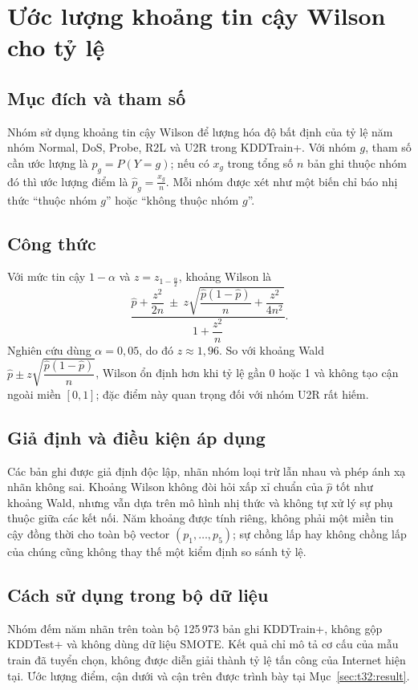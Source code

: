 \documentclass[../main.tex]{subfiles}
\begin{document}
\section{Ước lượng khoảng tin cậy Wilson cho tỷ lệ}
\label{sec:t32:method}

\subsection{Mục đích và tham số}
Nhóm sử dụng khoảng tin cậy Wilson để lượng hóa độ bất định của tỷ lệ năm nhóm
Normal, DoS, Probe, R2L và U2R trong KDDTrain+. Với nhóm $g$, tham số cần ước lượng là
$p_g=P(Y=g)$; nếu có $x_g$ trong tổng số $n$ bản ghi thuộc nhóm đó thì ước lượng điểm là
$\widehat p_g=\frac{x_g}{n}$. Mỗi nhóm được xét như một biến chỉ báo nhị thức ``thuộc
nhóm $g$'' hoặc ``không thuộc nhóm $g$''.

\subsection{Công thức}
Với mức tin cậy $1-\alpha$ và $z=z_{1-\frac{\alpha}{2}}$, khoảng Wilson là
\[
\frac{
  \widehat p+\dfrac{z^2}{2n}
  \ \pm\ z\sqrt{\dfrac{\widehat p(1-\widehat p)}{n}+\dfrac{z^2}{4n^2}}
}{1+\dfrac{z^2}{n}}.
\]
Nghiên cứu dùng $\alpha=0{,}05$, do đó $z\approx1{,}96$. So với khoảng Wald
$\widehat p\pm z\sqrt{\dfrac{\widehat p(1-\widehat p)}{n}}$, Wilson ổn định hơn khi
tỷ lệ gần 0 hoặc 1 và không tạo cận ngoài miền $[0,1]$; đặc điểm này quan trọng đối
với nhóm U2R rất hiếm.

\subsection{Giả định và điều kiện áp dụng}
Các bản ghi được giả định độc lập, nhãn nhóm loại trừ lẫn nhau và phép ánh xạ nhãn
không sai. Khoảng Wilson không đòi hỏi xấp xỉ chuẩn của $\widehat p$ tốt như khoảng
Wald, nhưng vẫn dựa trên mô hình nhị thức và không tự xử lý sự phụ thuộc giữa các kết
nối. Năm khoảng được tính riêng, không phải một miền tin cậy đồng thời cho toàn bộ
vector $(p_1,\ldots,p_5)$; sự chồng lấp hay không chồng lấp của chúng cũng không thay
thế một kiểm định so sánh tỷ lệ.

\subsection{Cách sử dụng trong bộ dữ liệu}
Nhóm đếm năm nhãn trên toàn bộ 125\,973 bản ghi KDDTrain+, không gộp KDDTest+ và không
dùng dữ liệu SMOTE. Kết quả chỉ mô tả cơ cấu của mẫu train đã tuyển chọn, không được
diễn giải thành tỷ lệ tấn công của Internet hiện tại. Ước lượng điểm, cận dưới và cận
trên được trình bày tại Mục~\ref{sec:t32:result}.
\end{document}

